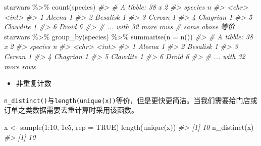 \documentclass[
]{book}
\newenvironment{Shaded}{\begin{snugshade}}{\end{snugshade}}
\newcommand{\AttributeTok}[1]{\textcolor[rgb]{0.77,0.63,0.00}{#1}}
\newcommand{\CommentTok}[1]{\textcolor[rgb]{0.56,0.35,0.01}{\textit{#1}}}
\newcommand{\ConstantTok}[1]{\textcolor[rgb]{0.00,0.00,0.00}{#1}}
\newcommand{\DecValTok}[1]{\textcolor[rgb]{0.00,0.00,0.81}{#1}}
\newcommand{\FloatTok}[1]{\textcolor[rgb]{0.00,0.00,0.81}{#1}}
\newcommand{\FunctionTok}[1]{\textcolor[rgb]{0.00,0.00,0.00}{#1}}
\newcommand{\NormalTok}[1]{#1}
\newcommand{\OtherTok}[1]{\textcolor[rgb]{0.56,0.35,0.01}{#1}}
\newcommand{\SpecialCharTok}[1]{\textcolor[rgb]{0.00,0.00,0.00}{#1}}
\providecommand{\tightlist}{%
  \setlength{\itemsep}{0pt}\setlength{\parskip}{0pt}}
\begin{document}
\begin{Shaded}
\begin{Highlighting}[]
\NormalTok{starwars }\SpecialCharTok{\%\textgreater{}\%} \FunctionTok{count}\NormalTok{(species)}
\CommentTok{\#\textgreater{} \# A tibble: 38 x 2}
\CommentTok{\#\textgreater{}   species      n}
\CommentTok{\#\textgreater{}   \textless{}chr\textgreater{}    \textless{}int\textgreater{}}
\CommentTok{\#\textgreater{} 1 Aleena       1}
\CommentTok{\#\textgreater{} 2 Besalisk     1}
\CommentTok{\#\textgreater{} 3 Cerean       1}
\CommentTok{\#\textgreater{} 4 Chagrian     1}
\CommentTok{\#\textgreater{} 5 Clawdite     1}
\CommentTok{\#\textgreater{} 6 Droid        6}
\CommentTok{\#\textgreater{} \# ... with 32 more rows}
\CommentTok{\# same above 等价}
\NormalTok{starwars }\SpecialCharTok{\%\textgreater{}\%} \FunctionTok{group\_by}\NormalTok{(species) }\SpecialCharTok{\%\textgreater{}\%} \FunctionTok{summarise}\NormalTok{(}\AttributeTok{n =} \FunctionTok{n}\NormalTok{())}
\CommentTok{\#\textgreater{} \# A tibble: 38 x 2}
\CommentTok{\#\textgreater{}   species      n}
\CommentTok{\#\textgreater{}   \textless{}chr\textgreater{}    \textless{}int\textgreater{}}
\CommentTok{\#\textgreater{} 1 Aleena       1}
\CommentTok{\#\textgreater{} 2 Besalisk     1}
\CommentTok{\#\textgreater{} 3 Cerean       1}
\CommentTok{\#\textgreater{} 4 Chagrian     1}
\CommentTok{\#\textgreater{} 5 Clawdite     1}
\CommentTok{\#\textgreater{} 6 Droid        6}
\CommentTok{\#\textgreater{} \# ... with 32 more rows}
\end{Highlighting}
\end{Shaded}

\begin{itemize}
\tightlist
\item
  非重复计数
\end{itemize}

\texttt{n\_distinct()}与\texttt{length(unique(x))}等价，但是更快更简洁。当我们需要给门店或订单之类数据需要去重计算时采用该函数。

\begin{Shaded}
\begin{Highlighting}[]
\NormalTok{x }\OtherTok{\textless{}{-}} \FunctionTok{sample}\NormalTok{(}\DecValTok{1}\SpecialCharTok{:}\DecValTok{10}\NormalTok{, }\FloatTok{1e5}\NormalTok{, }\AttributeTok{rep =} \ConstantTok{TRUE}\NormalTok{)}
\FunctionTok{length}\NormalTok{(}\FunctionTok{unique}\NormalTok{(x))}
\CommentTok{\#\textgreater{} [1] 10}
\FunctionTok{n\_distinct}\NormalTok{(x)}
\CommentTok{\#\textgreater{} [1] 10}
\end{Highlighting}
\end{Shaded}
\end{document}
